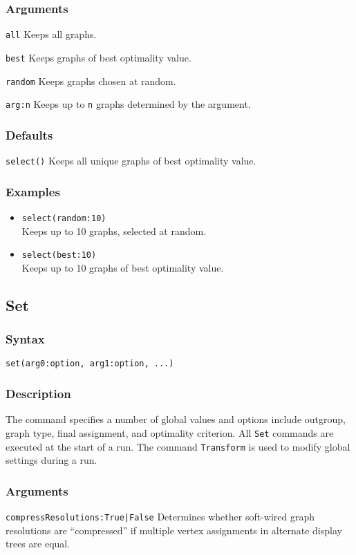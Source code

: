 \documentclass[11pt]{article}
\begin{document}
		\subsubsection{Arguments}
			\noindent \texttt{all} Keeps all graphs.
		
			\smallskip		
			\noindent \texttt{best} Keeps graphs of best optimality value.
			
			\smallskip		
			\noindent \texttt{random} Keeps graphs chosen at random.
			
			\smallskip		
			\noindent \texttt{arg:n} Keeps up to \texttt{n} graphs determined by the argument.
		\subsubsection{Defaults}
			\texttt{select()} Keeps all unique graphs of best optimality value.
		\subsubsection{Examples}
				\begin{itemize}
					\item{\texttt{select(random:10)}\\ Keeps up to 10 graphs, selected at random.}
					\item{\texttt{select(best:10)}\\ Keeps up to 10 graphs of best optimality value.}
				\end{itemize}
			
	\subsection{Set}
		\subsubsection{Syntax}
				\texttt{set(arg0:option, arg1:option, ...)}
		\subsubsection{Description}
		The command specifies a number of global values and options include outgroup, graph type, final assignment, and optimality criterion. All \texttt{Set} commands
		are executed at the start of a run.  The command \texttt{Transform} is used to modify global settings during a run.
		\subsubsection{Arguments}
			\smallskip
			\noindent \texttt{compressResolutions:True|False} Determines whether soft-wired graph resolutions are ``compressed''
			if multiple vertex assignments in alternate display trees are equal.
			
\end{document}
